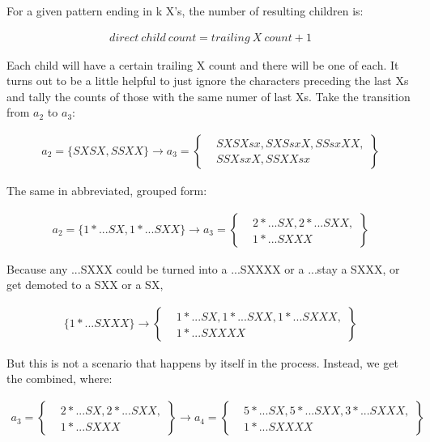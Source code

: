 \documentclass{article}
\begin{document}
For a given pattern ending in k X's, the number of resulting children is:

\begin{align}
  direct~child~count=trailing~X~count + 1
\end{align}

Each child will have a certain trailing X count and there will be one of each.  It turns out to be a little helpful to just ignore the characters preceding the last Xs and tally the counts of those with the same numer of last Xs.  Take the transition from $a_2$ to $a_3$:

\begin{align*}
  a_2 = \{SXSX,SSXX\} \rightarrow a_3 =
  \left\{
    \begin{aligned}
      & SXSXsx, SXSsxX, SSsxXX, \\
      & SSXsxX, SSXXsx
    \end{aligned}
  \right\}
\end{align*}

The same in abbreviated, grouped form:

\begin{align*}
  a_2 = \{1 * ...SX,1 * ...SXX\} \rightarrow a_3 =
  \left\{
    \begin{aligned}
      & 2 * ...SX, 2 * ...SXX, \\
      & 1 * ...SXXX
    \end{aligned}
  \right\}
\end{align*}

Because any ...SXXX could be turned into a ...SXXXX or a ...stay a SXXX, or get demoted to a SXX or a SX,

\begin{align*}
  \{1 * ...SXXX\} \rightarrow
  \left\{
    \begin{aligned}
      & 1 * ...SX, 1 * ...SXX, 1 * ...SXXX, \\
      & 1 * ...SXXXX
    \end{aligned}
  \right\}
\end{align*}

But this is not a scenario that happens by itself in the process.  Instead, we get the combined, where:



\begin{align*}
  a_3 = 
  \left\{
    \begin{aligned}
      & 2 * ...SX, 2 * ...SXX, \\
      & 1 * ...SXXX
    \end{aligned}
  \right\} \rightarrow a_4 =
  \left\{
    \begin{aligned}
      & 5 * ...SX, 5 * ...SXX, 3 * ...SXXX, \\
      & 1 * ...SXXXX
    \end{aligned}
  \right\}
\end{align*}
\end{document}

